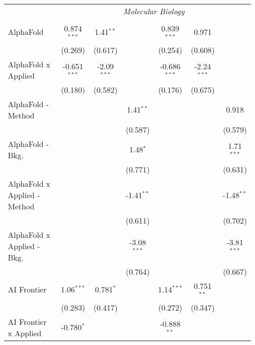 \begin{tabular}{lcccccc}
 & \multicolumn{6}{c}{\textit{Molecular Biology}} \\ \\
   AlphaFold                    & 0.874$^{***}$  & 1.41$^{**}$   &               & 0.839$^{***}$  & 0.971         &   \\   
                                & (0.269)        & (0.617)       &               & (0.254)        & (0.608)       &   \\   
   AlphaFold x Applied          & -0.651$^{***}$ & -2.09$^{***}$ &               & -0.686$^{***}$ & -2.24$^{***}$ &   \\   
                                & (0.180)        & (0.582)       &               & (0.176)        & (0.675)       &   \\   
   AlphaFold - Method           &                &               & 1.41$^{**}$   &                &               & 0.918\\   
                                &                &               & (0.587)       &                &               & (0.579)\\   
   AlphaFold - Bkg.             &                &               & 1.48$^{*}$    &                &               & 1.71$^{***}$\\   
                                &                &               & (0.771)       &                &               & (0.631)\\   
   AlphaFold x Applied - Method &                &               & -1.41$^{**}$  &                &               & -1.48$^{**}$\\   
                                &                &               & (0.611)       &                &               & (0.702)\\   
   AlphaFold x Applied - Bkg.   &                &               & -3.08$^{***}$ &                &               & -3.81$^{***}$\\   
                                &                &               & (0.764)       &                &               & (0.667)\\   
   AI Frontier                  & 1.06$^{***}$   & 0.781$^{*}$   &               & 1.14$^{***}$   & 0.751$^{**}$  &   \\   
                                & (0.283)        & (0.417)       &               & (0.272)        & (0.347)       &   \\   
   AI Frontier x Applied        & -0.780$^{*}$   &               &               & -0.888$^{**}$  &               &   \\   

\end{tabular}
